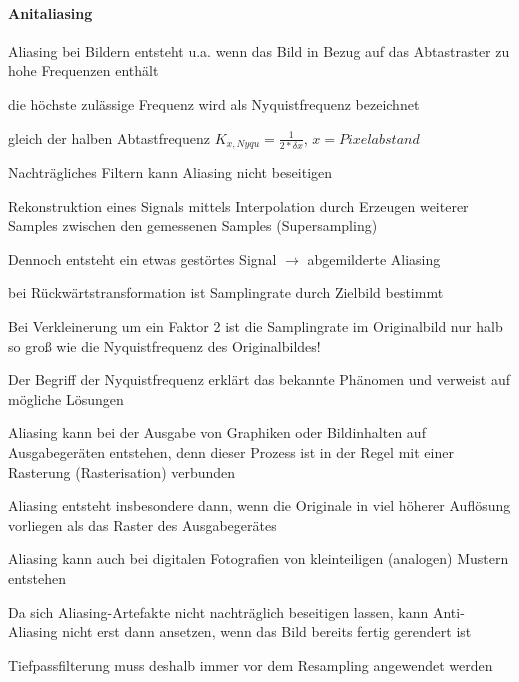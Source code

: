 \documentclass[landscape]{article}
\begin{document}
\begin{multicols}{3}
  \paragraph{Anitaliasing}
  \begin{itemize*}
    \item Aliasing bei Bildern entsteht u.a. wenn das Bild in Bezug auf das Abtastraster zu hohe Frequenzen enthält
    \item die höchste zulässige Frequenz wird als Nyquistfrequenz bezeichnet
    \begin{itemize*}
      \item gleich der halben Abtastfrequenz $K_{x,Nyqu}=\frac{1}{2*\delta x}$, $x = Pixelabstand$
      \item Nachträgliches Filtern kann Aliasing nicht beseitigen
    \end{itemize*}
    \item Rekonstruktion eines Signals mittels Interpolation durch Erzeugen weiterer Samples zwischen den gemessenen Samples (Supersampling)
    \item Dennoch entsteht ein etwas gestörtes Signal $\rightarrow$ abgemilderte Aliasing
    \item bei Rückwärtstransformation ist Samplingrate durch Zielbild bestimmt
    \item Bei Verkleinerung um ein Faktor 2 ist die Samplingrate im Originalbild nur halb so groß wie die Nyquistfrequenz des Originalbildes!
    \item Der Begriff der Nyquistfrequenz erklärt das bekannte Phänomen und verweist auf mögliche Lösungen
    \item Aliasing kann bei der Ausgabe von Graphiken oder Bildinhalten auf Ausgabegeräten entstehen, denn dieser Prozess ist in der Regel mit einer Rasterung (Rasterisation) verbunden
    \item Aliasing entsteht insbesondere dann, wenn die Originale in viel höherer Auflösung vorliegen als das Raster des Ausgabegerätes
    \item Aliasing kann auch bei digitalen Fotografien von kleinteiligen (analogen) Mustern entstehen
    \item Da sich Aliasing-Artefakte nicht nachträglich beseitigen lassen, kann Anti-Aliasing nicht erst dann ansetzen, wenn das Bild bereits fertig gerendert ist
    \item Tiefpassfilterung muss deshalb immer vor dem Resampling angewendet werden
  \end{itemize*}
  

\end{multicols}
\end{document}
